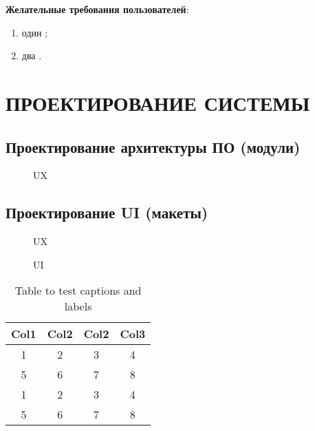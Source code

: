 \documentclass[
  12pt, %
  a4paper, %
  simple, %
  floatsection %
]{eskdtext}
\begin{document}
  \textbf{Желательные требования пользователей}:
  \begin{enumerate}
    \item один ;
    \item два .
  \end{enumerate}

  \newpage
  \section{ПРОЕКТИРОВАНИЕ СИСТЕМЫ}

  \subsection{Проектирование архитектуры ПО (модули)}

  \begin{figure}[!h]
    \centering
    \caption{UX}
  \end{figure}

  \subsection{Проектирование UI (макеты)}

  \begin{figure}[!h]
    \centering
    \caption{UX}
  \end{figure}

  \begin{figure}[!h]
    \centering
    \caption{UI}
  \end{figure}

  \begin{table}[h!]
    \centering
    \begin{tabular}{|c|c|c|c|} 
      \hline
      Col1 & Col2 & Col2 & Col3 \\
      \hline
      1 & 2 & 3 & 4 \\ \hline
      5 & 6 & 7 & 8 \\ \hline
      1 & 2 & 3 & 4 \\ \hline
      5 & 6 & 7 & 8 \\ \hline
    \end{tabular}
    \caption{Table to test captions and labels}
    \label{table:1}
  \end{table}
\end{document}
